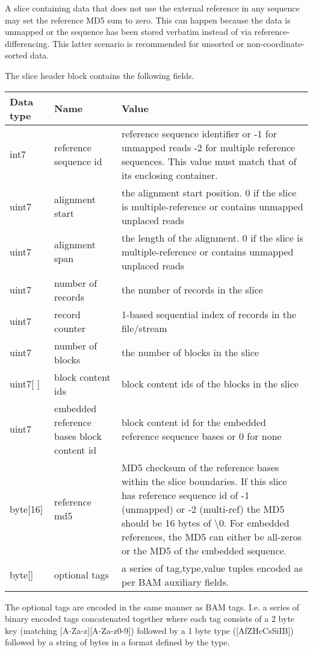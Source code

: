 \documentclass[a4paper]{article}
\begin{document}
A slice containing data that does not use the external reference in
any sequence may set the reference MD5 sum to zero.  This can happen
because the data is unmapped or the sequence has been stored verbatim
instead of via reference-differencing.  This latter scenario is
recommended for unsorted or non-coordinate-sorted data.

The slice header block contains the following fields.

\begin{tabular}{|l|l|>{\raggedright}p{200pt}|}
\hline
\textbf{Data type} & \textbf{Name} & \textbf{Value}\tabularnewline
\hline
int7 & reference sequence id & reference sequence identifier or\linebreak{}
-1 for unmapped reads\linebreak{}
-2 for multiple reference sequences.\linebreak{}
This value must match that of its enclosing container.\tabularnewline
\hline
uint7 & alignment start & the alignment start position.\linebreak{}
0 if the slice is multiple-reference
or contains unmapped unplaced reads\tabularnewline
\hline
uint7 & alignment span & the length of the alignment.\linebreak{}
0 if the slice is multiple-reference
or contains unmapped unplaced reads\tabularnewline
\hline
uint7 & number of records & the number of records in the slice\tabularnewline
\hline
uint7 & record counter & 1-based sequential index of records in the file/stream\tabularnewline
\hline
uint7 & number of blocks & the number of blocks in the slice\tabularnewline
\hline
uint7[ ] & block content ids & block content ids of the blocks in the slice\tabularnewline
\hline
uint7 & embedded reference bases block content id & block content id for the embedded 
reference sequence bases or 0 for none\tabularnewline
\hline
byte[16] & reference md5 & MD5 checksum of the reference bases within the slice 
boundaries.  If this slice has reference sequence id of -1 (unmapped) or -2 (multi-ref)
the MD5 should be 16 bytes of \textbackslash{}0. For embedded references, the MD5
can either be all-zeros or the MD5 of the embedded sequence.\tabularnewline
\hline
byte[] & optional tags & a series of tag,type,value tuples encoded as
per BAM auxiliary fields.\tabularnewline
\hline
\end{tabular}

The optional tags are encoded in the same manner as BAM tags.  I.e. a
series of binary encoded tags concatenated together where each tag
consists of a 2 byte key (matching [A-Za-z][A-Za-z0-9]) followed by a
1 byte type ([AfZHcCsSiIB]) followed by a string of bytes in a format
defined by the type.
\end{document}
